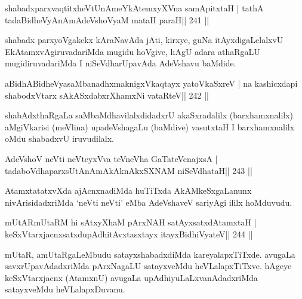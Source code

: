 
\begin{shl}
shabadxparxvaqtitxheVtUnAmeYkAtemxyXVna samApitxtaH |
tathA tadaBidheVyAnAmAdeVshoV\s yaM mataH paraH\hfill || 241 ||
\end{shl}

\begin{artha}
shabadx parxyoVgakekx kAraNavAda jAti, kirxye, guNa itAyxdigaLelalxvU EkAtamxvAgiruvadariMda mugidu hoVgive, hAgU adara athaRgaLU mugidiruvadariMda I niSeVdharUpavAda AdeVshavu baMdide.
\end{artha}

\begin{shl}
aBidhABidheVyasaMbanadhxmaknigxVkaqtayx yatoV\s kaSxreV |
na kashicxdapi shabodxV\s tarx sAkASxdabxrXhamxNi vataRteV\hfill || 242 ||
\end{shl}

\begin{artha}
shabAdxthaRgaLa saMbaMdhavilalxdidadxrU akaSxradalilx (barxhamxnalilx) aMgiVkarisi (meVlina) upadeVshagaLu (baMdive) vasutxtaH I barxhamxnalilx oMdu shabadxvU iruvudilalx.
\end{artha}


\begin{shl}
AdeVshoV neVti neVteyxVva teVneVha GaTateV\s cnajxsA |
tadaboVdhaparxsUtAnAmAkAknAkxSXNAM niSeVdhataH\hfill || 243 ||
\end{shl}

\begin{artha}
AtamxtatatxvXda ajAcnxnadiMda huTiTxda AkAMkeSxgaLanunx nivArisidadxriMda `neVti neVti' eMba AdeVshaveV sariyAgi ililx hoMduvudu.
\end{artha}


\begin{shl}
mUtARmUtaRM hi sAtxyXhaM pArxNAH satAyxsatxdAtamxtaH |
keSxVtarxjacnxsatxdupAdhitAvxtasxtayx itayxBidhiVyateV\hfill || 244 ||
\end{shl}

\begin{artha}
mUtaR, amUtaRgaLeMbudu satayxshabadxdiMda kareyalapxTiTxde. avugaLa savxrUpavAdadxriMda pArxNagaLU satayxveMdu heVLalapxTiTxve. hAgeye keSxVtarxjacnx (AtamxnU) avugaLa upAdhiyuLaLxvanAdadxriMda satayxveMdu heVLalapxDuvanu.
\end{artha}

